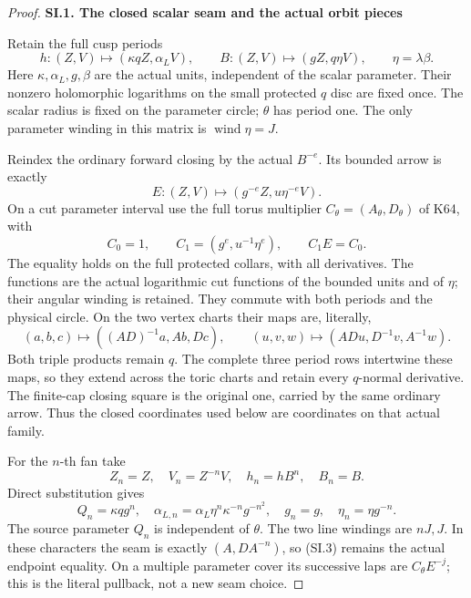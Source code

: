 \begin{proof}
\par

\medskip\noindent\textbf{SI.1. The closed scalar seam and the actual orbit pieces}

\par\nobreak

Retain the full cusp periods
\[
 h:(Z,V)\longmapsto(\kappa qZ,\alpha_LV),\qquad
 B:(Z,V)\longmapsto(gZ,q\eta V),\qquad \eta=\lambda\beta.
                                                        \tag{SI.1}
\]
Here \(\kappa,\alpha_L,g,\beta\) are the actual units, independent of the
scalar parameter. Their nonzero holomorphic logarithms on the small
protected \(q\) disc are fixed once. The scalar radius is fixed on the
parameter circle; \(\theta\) has period one. The only parameter winding
in this matrix is \(\operatorname{wind}\eta=J\).

Reindex the ordinary forward closing by the actual \(B^{-e}\). Its bounded
arrow is exactly
\[
 E:(Z,V)\longmapsto(g^{-e}Z,u\eta^{-e}V).
                                                        \tag{SI.2}
\]
On a cut parameter interval use the full torus multiplier
\(C_\theta=(A_\theta,D_\theta)\) of K64, with
\[
 C_0=1,\qquad C_1=(g^e,u^{-1}\eta^e),\qquad C_1E=C_0.
                                                        \tag{SI.3}
\]
The equality holds on the full protected collars, with all derivatives.
The functions are the actual logarithmic cut functions of the bounded
units and of \(\eta\); their angular winding is retained. They commute
with both periods and the physical circle. On the two vertex charts
their maps are, literally,
\[
 (a,b,c)\longmapsto((AD)^{-1}a,Ab,Dc),\qquad
 (u,v,w)\longmapsto(ADu,D^{-1}v,A^{-1}w).
                                                        \tag{SI.4}
\]
Both triple products remain \(q\). The complete three period rows
intertwine these maps, so they extend across the toric charts and
retain every \(q\)-normal derivative. The finite-cap closing square is
the original one, carried by the same ordinary arrow. Thus the closed
coordinates used below are coordinates on that actual family.

For the \(n\)-th fan take
\[
 Z_n=Z,\quad V_n=Z^{-n}V,\quad h_n=hB^n,\quad B_n=B.
\]
Direct substitution gives
\[
 Q_n=\kappa qg^n,\quad
 \alpha_{L,n}=\alpha_L\eta^n\kappa^{-n}g^{-n^2},\quad
 g_n=g,\quad\eta_n=\eta g^{-n}.                       \tag{SI.5}
\]
The source parameter \(Q_n\) is independent of \(\theta\). The two line
windings are \(nJ,J\). In these characters the seam is exactly
\((A,D A^{-n})\), so (SI.3) remains the actual endpoint equality. On a
multiple parameter cover its successive laps are \(C_\theta E^{-j}\);
this is the literal pullback, not a new seam choice.


\end{proof}
